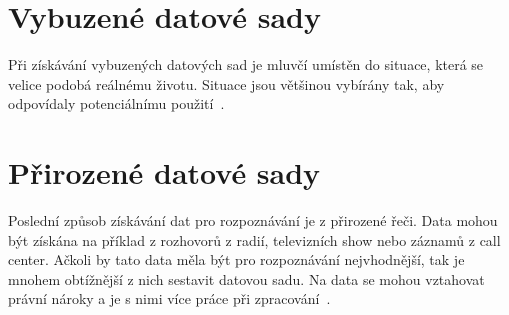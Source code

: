 \documentclass[FM,BP]{tulthesis}
\begin{document}
\section{Vybuzené datové sady} %
Při získávání vybuzených datových sad je mluvčí umístěn do situace, která se velice podobá reálnému životu. Situace jsou většinou vybírány tak, aby odpovídaly potenciálnímu použití~\cite{konar_chakraborty_2015}.

\section{Přirozené datové sady} %
Poslední způsob získávání dat pro rozpoznávání je z přirozené řeči. Data mohou být získána na příklad z rozhovorů z radií, televizních show nebo záznamů z call center. Ačkoli by tato data měla být pro rozpoznávání nejvhodnější, tak je mnohem obtížnější z nich sestavit datovou sadu. Na data se mohou vztahovat právní nároky a je s nimi více práce při zpracování~\cite{DBLP:journals/speech/AkcayO20}.
\end{document}
